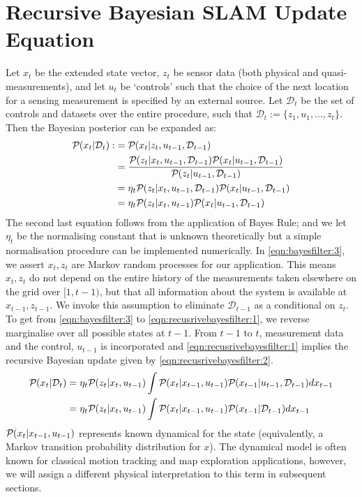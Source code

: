 \section{Recursive Bayesian SLAM Update Equation}

	Let $x_t$ be the extended state vector, $z_t$ be sensor data (both physical and quasi-measurements), and let $u_t$ be `controls' such that the choice of the next location for a sensing measurement is specified by an external source. Let $\mathcal{D}_t$ be the set of controls and datasets over the entire procedure, such that $\mathcal{D}_t := \{z_1, u_1, \hdots, z_t \}$. Then the Bayesian posterior can be expanded as:
	\begin{align}
	\mathcal{P}_{} ( x_t | \mathcal{D}_t ) :&= \mathcal{P}_{} ( x_t | z_t, u_{t-1},\mathcal{D}_{t-1} ) \\
	&= \frac{\mathcal{P}_{} ( z_t | x_t, u_{t-1}, \mathcal{D}_{t-1} ) \mathcal{P}_{} ( x_t| u_{t-1}, \mathcal{D}_{t-1} ) }{\mathcal{P}_{} (  z_t| u_{t-1}, \mathcal{D}_{t-1} )} \label{eqn:bayesfilter:1} \\
	&= \eta_t\mathcal{P}_{} ( z_t | x_t, u_{t-1}, \mathcal{D}_{t-1} ) \mathcal{P}_{} ( x_t| u_{t-1}, \mathcal{D}_{t-1} ) \label{eqn:bayesfilter:2} \\
	& = \eta_t\mathcal{P}_{} ( z_t | x_t, u_{t-1} ) \mathcal{P}_{} ( x_t| u_{t-1}, \mathcal{D}_{t-1} ) \label{eqn:bayesfilter:3} 
	\end{align} The second last equation follows from the application of Bayes Rule; and we let $\eta_t$ be the normalising constant that is unknown theoretically but a simple normalisation procedure can be implemented numerically. In \cref{eqn:bayesfilter:3}, we assert $x_t, z_t$ are Markov random processes for our application. This means  $x_t, z_t$ do not depend on the entire history of the measurements taken elsewhere on the grid over $[1, t-1)$,  but that all information about the system is available at $x_{t-1}, z_{t-1}$. We invoke this assumption to eliminate $\mathcal{D}_{t-1}$ as a conditional on $z_t$.\\
	To get from \cref{eqn:bayesfilter:3} to  \cref{eqn:recusrivebayesfilter:1}, we reverse marginalise over all possible states at $t-1$. From $t-1$ to $t$, measurement data and the control, $u_{t-1}$ is incorporated and \cref{eqn:recusrivebayesfilter:1} implies the recursive Bayesian update given by \cref{eqn:recusrivebayesfilter:2}. 
	\begin{align}
	\mathcal{P}_{} ( x_t | \mathcal{D}_t ) &= \eta_t\mathcal{P}_{} ( z_t | x_t, u_{t-1} ) \int \mathcal{P}_{} ( x_t| x_{t-1}, u_{t-1} )  \mathcal{P}_{} (  x_{t-1}| u_{t-1}, \mathcal{D}_{t-1} ) dx_{t-1} \label{eqn:recusrivebayesfilter:1} \\
	&= \eta_t\mathcal{P}_{} ( z_t | x_t, u_{t-1} ) \int \mathcal{P}_{} ( x_t| x_{t-1}, u_{t-1} )  \mathcal{P}_{} (  x_{t-1}| \mathcal{D}_{t-1} ) dx_{t-1} \label{eqn:recusrivebayesfilter:2}
	\end{align} $\mathcal{P}_{} ( x_t| x_{t-1}, u_{t-1} ) $ represents known dynamical for the state (equivalently, a Markov transition probability distribution for $x$). The dynamical model is often known for classical motion tracking and map exploration applications, however, we will assign a different physical interpretation to this term in subsequent sections. \\
